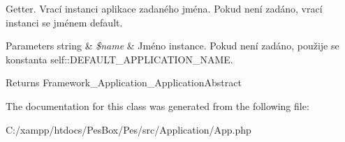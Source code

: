 Getter. Vrací instanci aplikace zadaného jména. Pokud není zadáno, vrací instanci se jménem \textquotesingle{}default\textquotesingle{}. 
\begin{DoxyParams}[1]{Parameters}
string & {\em \$name} & Jméno instance. Pokud není zadáno, použije se konstanta self\+::\+D\+E\+F\+A\+U\+L\+T\+\_\+\+A\+P\+P\+L\+I\+C\+A\+T\+I\+O\+N\+\_\+\+N\+A\+ME. \\
\hline
\end{DoxyParams}
\begin{DoxyReturn}{Returns}
Framework\+\_\+\+Application\+\_\+\+Application\+Abstract 
\end{DoxyReturn}


The documentation for this class was generated from the following file\+:\begin{DoxyCompactItemize}
\item 
C\+:/xampp/htdocs/\+Pes\+Box/\+Pes/src/\+Application/App.\+php\end{DoxyCompactItemize}
